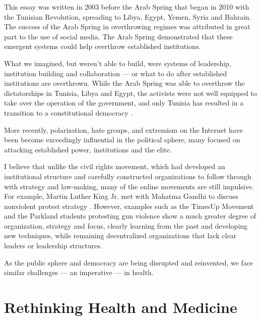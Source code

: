This essay was written in 2003 before the Arab Spring that began in 2010 with the Tunisian Revolution, spreading to Libya, Egypt, Yemen, Syria and Bahrain. The success of the Arab Spring in overthrowing regimes was attributed in great part to the use of social media. The Arab Spring demonstrated that these emergent systems could help overthrow established institutions.

What we imagined, but weren't able to build, were systems of leadership, institution building and collaboration --- or what to do after established institutions are overthrown. While the Arab Spring was able to overthrow the dictatorships in Tunisia, Libya and Egypt, the activists were not well equipped to take over the operation of the government, and only Tunisia has resulted in a transition to a constitutional democracy \cite{ruthven2016understand}.

More recently, polarization, hate groups, and extremism on the Internet have been become exceedingly influential in the political sphere, many focused on attacking established power, institutions and the elite.

I believe that unlike the civil rights movement, which had developed an institutional structure and carefully constructed organizations to follow through with strategy and law-making, many of the online movements are still impulsive. For example, Martin Luther King Jr. met with Mahatma Gandhi to discuss nonviolent protest strategy \cite{reddick}. However, examples such as the TimesUp Movement and the Parkland students protesting gun violence show a much greater degree of organization, strategy and focus, clearly learning from the past and developing new techniques, while remaining decentralized organizations that lack clear leaders or leadership structures.

As the public sphere and democracy are being disrupted and reinvented, we face similar challenges --- an imperative --- in health.

\section{Rethinking Health and Medicine}
\label{requiringhealth}

